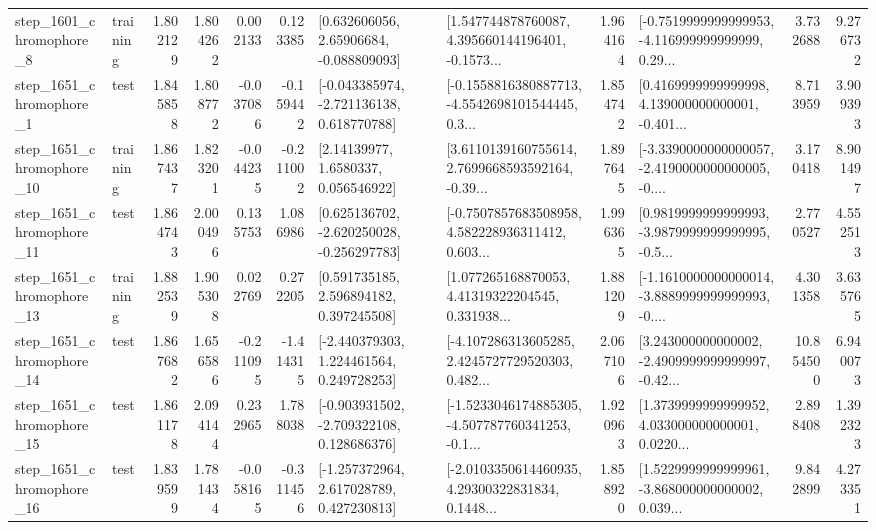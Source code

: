 \begin{tabular}{llrrrrllrlrr}
  step\_1601\_chromophore\_8 &  training &      1.802129 &    1.804262 &      0.002133 &  0.123385 &     [0.632606056, 2.65906684, -0.088809093] &  [1.547744878760087, 4.395660144196401, -0.1573... &       1.964164 &  [-0.7519999999999953, -4.116999999999999, 0.29... &            3.732688 &          9.276732 \\
  step\_1651\_chromophore\_1 &      test &      1.845858 &    1.808772 &     -0.037086 & -0.159442 &   [-0.043385974, -2.721136138, 0.618770788] &  [-0.1558816380887713, -4.5542698101544445, 0.3... &       1.854742 &  [0.4169999999999998, 4.139000000000001, -0.401... &            8.713959 &          3.909393 \\
 step\_1651\_chromophore\_10 &  training &      1.867437 &    1.823201 &     -0.044235 & -0.211002 &        [2.14139977, 1.6580337, 0.056546922] &  [3.6110139160755614, 2.7699668593592164, -0.39... &       1.897645 &  [-3.3390000000000057, -2.4190000000000005, -0.... &            3.170418 &          8.901497 \\
 step\_1651\_chromophore\_11 &      test &      1.864743 &    2.000496 &      0.135753 &  1.086986 &   [0.625136702, -2.620250028, -0.256297783] &  [-0.7507857683508958, 4.582228936311412, 0.603... &       1.996365 &  [0.9819999999999993, -3.9879999999999995, -0.5... &            2.770527 &          4.552513 \\
 step\_1651\_chromophore\_13 &  training &      1.882539 &    1.905308 &      0.022769 &  0.272205 &     [0.591735185, 2.596894182, 0.397245508] &  [1.077265168870053, 4.41319322204545, 0.331938... &       1.881209 &  [-1.1610000000000014, -3.8889999999999993, -0.... &            4.301358 &          3.635765 \\
 step\_1651\_chromophore\_14 &      test &      1.867682 &    1.656586 &     -0.211095 & -1.414315 &    [-2.440379303, 1.224461564, 0.249728253] &  [-4.107286313605285, 2.4245727729520303, 0.482... &       2.067106 &  [3.243000000000002, -2.4909999999999997, -0.42... &           10.854500 &          6.940073 \\
 step\_1651\_chromophore\_15 &      test &      1.861178 &    2.094144 &      0.232965 &  1.788038 &   [-0.903931502, -2.709322108, 0.128686376] &  [-1.5233046174885305, -4.507787760341253, -0.1... &       1.920963 &  [1.3739999999999952, 4.033000000000001, 0.0220... &            2.898408 &          1.392323 \\
 step\_1651\_chromophore\_16 &      test &      1.839599 &    1.781434 &     -0.058165 & -0.311456 &    [-1.257372964, 2.617028789, 0.427230813] &  [-2.0103350614460935, 4.29300322831834, 0.1448... &       1.858920 &  [1.5229999999999961, -3.868000000000002, 0.039... &            9.842899 &          4.273351 \\

\end{tabular}

